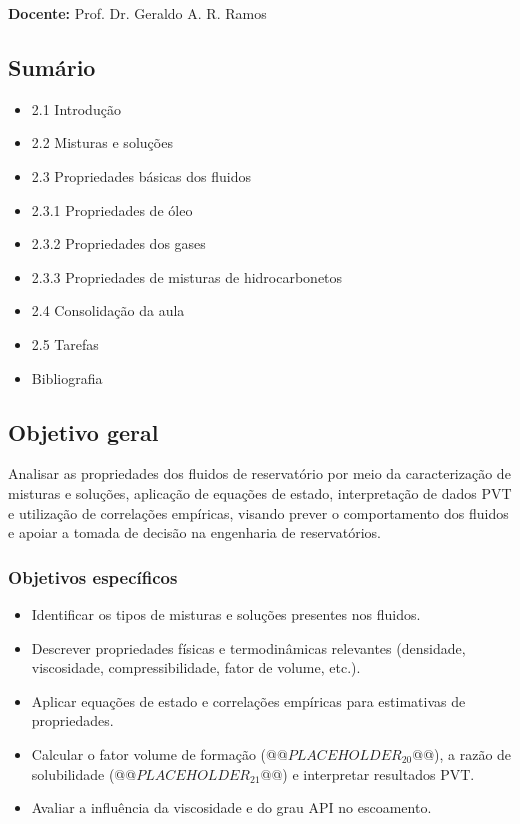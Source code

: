 \documentclass[11pt,a4paper]{article}
\begin{document}
\textbf{Docente:} Prof. Dr. Geraldo A. R. Ramos


\subsection{Sumário}
\begin{itemize}
\item 2.1 Introdução
\item 2.2 Misturas e soluções
\item 2.3 Propriedades básicas dos fluidos
\item 2.3.1 Propriedades de óleo
\item 2.3.2 Propriedades dos gases
\item 2.3.3 Propriedades de misturas de hidrocarbonetos
\item 2.4 Consolidação da aula
\item 2.5 Tarefas
\item Bibliografia
\end{itemize}


\subsection{Objetivo geral}
Analisar as propriedades dos fluidos de reservatório por meio da caracterização de misturas e soluções, aplicação de equações de estado, interpretação de dados PVT e utilização de correlações empíricas, visando prever o comportamento dos fluidos e apoiar a tomada de decisão na engenharia de reservatórios.

\subsubsection{Objetivos específicos}
\begin{itemize}
\item Identificar os tipos de misturas e soluções presentes nos fluidos.
\item Descrever propriedades físicas e termodinâmicas relevantes (densidade, viscosidade, compressibilidade, fator de volume, etc.).
\item Aplicar equações de estado e correlações empíricas para estimativas de propriedades.
\item Calcular o fator volume de formação (@@$PLACEHOLDER_{20}$@@), a razão de solubilidade (@@$PLACEHOLDER_{21}$@@) e interpretar resultados PVT.
\item Avaliar a influência da viscosidade e do grau API no escoamento.
\end{itemize}
\end{document}
